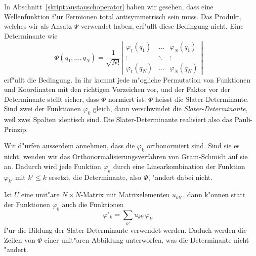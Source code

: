 In Abschnitt~\ref{skript:austauschoperator} haben wir gesehen, dass eine
Wellenfunktion f"ur Fermionen total antisymmetrisch sein muss.
Das Produkt, welches wir als Ansatz $\Psi$ verwendet haben, erf"ullt
diese Bedingung nicht.
Eine Determinante wie
\[
\Phi(q_1,\dots,q_N)=\frac{1}{\sqrt{N!}}
\left|\begin{matrix}
\varphi_1(q_1)&\dots &\varphi_N(q_1)\\
\vdots        &\ddots&\vdots        \\
\varphi_1(q_N)&\dots &\varphi_N(q_N)
\end{matrix}\right|
\]
erf"ullt die Bedingung. In ihr kommt jede m"ogliche Permutation von
Funktionen und Koordinaten mit den richtigen Vorzeichen vor, und der
Faktor vor der Determinante stellt sicher, dass $\Phi$ normiert ist.
$\Phi$ heisst die Slater-Determinante.
%
Sind zwei der Funktionen $\varphi_k$ gleich, dann verschwindet die 
{\em Slater-Determinante}, weil zwei Spalten identisch sind.
Die Slater-Determinante realisiert also das Pauli-Prinzip.

Wir d"urfen ausserdem annehmen, dass die $\varphi_k$ orthonormiert sind. 
Sind sie es nicht, wenden wir das Orthonormalisierungsverfahren von 
Gram-Schmidt auf sie an. Dadurch wird jede Funktion $\varphi_k$
durch eine Linearkombination der Funktion $\varphi_{k'}$ mit $k'\le k$
ersetzt, die Determinante, also $\Phi$, "andert dabei nicht.

Ist $U$ eine unit"are $N\times N$-Matrix mit Matrixelementen
$u_{kk'}$, dann k"onnen statt der Funktionen $\varphi_k$
auch die Funktionen 
\begin{equation}
\varphi'_k = \sum_{k'}u_{kk'}\varphi_{k'}
\label{skript:hfunitaer}
\end{equation}
f"ur die Bildung der Slater-Determinante verwendet werden.
Daduch werden die Zeilen von $\Phi$ einer unit"aren Abbildung
unterworfen, was die Determinante nicht "andert.

